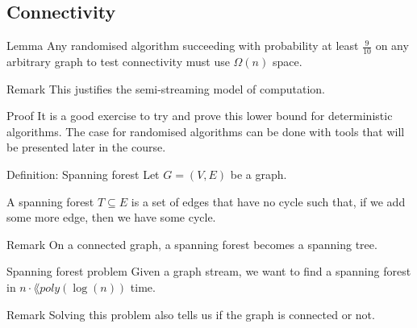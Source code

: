\documentclass[a4paper]{article}
\begin{document}
\subsection{Connectivity}

\begin{parag}{Lemma}
    Any randomised algorithm succeeding with probability at least $\frac{9}{10}$ on any arbitrary graph to test connectivity must use $\Omega\left(n\right)$ space.

    \begin{subparag}{Remark}
        This justifies the semi-streaming model of computation.
    \end{subparag}

    \begin{subparag}{Proof}
        It is a good exercise to try and prove this lower bound for deterministic algorithms. The case for randomised algorithms can be done with tools that will be presented later in the course.
    \end{subparag}
\end{parag}

\begin{parag}{Definition: Spanning forest}
    Let $G = \left(V, E\right)$ be a graph. 

    A spanning forest $T \subseteq E$ is a set of edges that have no cycle such that, if we add some more edge, then we have some cycle.

    \begin{subparag}{Remark}
        On a connected graph, a spanning forest becomes a spanning tree.
    \end{subparag}
\end{parag}

\begin{parag}{Spanning forest problem}
    Given a graph stream, we want to find a spanning forest in $n\cdot\lang{poly}\left(\log\left(n\right)\right)$ time.

    \begin{subparag}{Remark}
        Solving this problem also tells us if the graph is connected or not.
    \end{subparag}
\end{parag}
\end{document}
